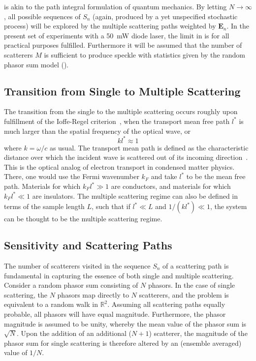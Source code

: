 is akin to the path integral formulation of
quantum mechanics.  By letting $N\to\infty$, all possible sequences of $S_n$
(again, produced by a yet unspecified stochastic process) will be explored by
the multiple scattering paths weighted by $\mathbf{E}_n$.  In the present set
of experiments with a \SI{50}{\milli\watt} diode laser, the limit in
 is for all practical purposes fulfilled.
Furthermore it will be assumed that the number of scatterers $M$ is sufficient
to produce speckle with statistics given by the random phasor sum model
().



\subsection{Transition from Single to Multiple Scattering}
The transition from the single to the multiple scattering occurs roughly upon
fulfillment of the Ioffe-Regel criterion~\cite{ioffe1960non}, when the
transport mean free path $l^*$ is much larger than the spatial frequency of
the optical wave, or
\begin{equation}
k l^* \approx 1
\end{equation}
where $k=\omega/c$ as usual.  The transport mean path is defined as the
characteristic distance over which the incident wave is scattered out of its
incoming direction~\cite{berkovits1994correlations}.  This is the optical
analog of electron transport in condensed matter physics.  There, one would
use the Fermi wavenumber $k_F$ and take $l^*$ to be the mean free path.
Materials for which $k_F l^* \gg 1$ are conductors, and materials for which
$k_F l^* \ll 1$ are insulators.  The multiple scattering regime can also be
defined in terms of the sample length $L$, such that if $l^* \ll L$ and $1/(k
l^*) \ll 1$, the system can be thought to be the multiple scattering regime.

\subsection{Sensitivity and Scattering Paths}
\label{sec:senspaths}
The number of scatterers visited in the sequence $S_n$ of a scattering path is
fundamental in capturing the essence of both single and multiple scattering.
Consider a random phasor sum consisting of $N$ phasors.  In the case of single
scattering, the $N$ phasors map directly to $N$ scatterers, and the problem is
equivalent to a random walk in $\mathbb{R}^2$.  Assuming all scattering paths
equally probable, all phasors will have equal magnitude.  Furthermore, the
phasor magnitude is assumed to be unity, whereby the mean value of the phasor
sum is $\sqrt{N}$.  Upon the addition of an additional ($N+1$) scatterer, the
magnitude of the phasor sum for single scattering is therefore altered by an
(ensemble averaged) value of $1/N$.

